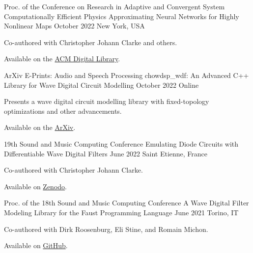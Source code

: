 \begin{cventries}
  \cventry
    {Proc. of the Conference on Research in Adaptive and Convergent System} %
    {Computationally Efficient Physics Approximating Neural Networks for Highly Nonlinear Maps} %
    {October 2022} %
    {New York, USA} %
    {
      \begin{cvitems} %
        \item {Co-authored with Christopher Johann Clarke and others.}
        \item {Available on the \href{https://dl.acm.org/doi/10.1145/3538641.3561501}{ACM Digital Library}.}
      \end{cvitems}
    }

  \cventry
    {ArXiv E-Prints: Audio and Speech Processing} %
    {chowdsp\_wdf: An Advanced C++ Library for Wave Digital Circuit Modelling} %
    {October 2022} %
    {Online} %
    {
      \begin{cvitems} %
        \item {Presents a wave digital circuit modelling library with fixed-topology optimizations and other advancements.}
        \item {Available on the \href{https://arxiv.org/abs/2210.12554}{ArXiv}.}
      \end{cvitems}
    }


  \cventry
    {19th Sound and Music Computing Conference} %
    {Emulating Diode Circuits with Differentiable Wave Digital Filters} %
    {June 2022} %
    {Saint Etienne, France} %
    {
      \begin{cvitems} %
        \item {Co-authored with Christopher Johann Clarke.}
        \item {Available on \href{https://zenodo.org/record/6566846}{Zenodo}.}
      \end{cvitems}
    }


  \cventry
    {Proc. of the 18th Sound and Music Computing Conference} %
    {A Wave Digital Filter Modeling Library for the Faust Programming Language} %
    {June 2021} %
    {Torino, IT} %
    {
      \begin{cvitems} %
        \item {Co-authored with Dirk Roosenburg, Eli Stine, and Romain Michon.}
        \item {Available on \href{https://github.com/droosenb/faust-wdf-library/blob/main/SMC-2021-paper/a-wave-digital-filter-modeling-library-for-faust.pdf}{GitHub}.}
      \end{cvitems}
    }


\end{cventries}
